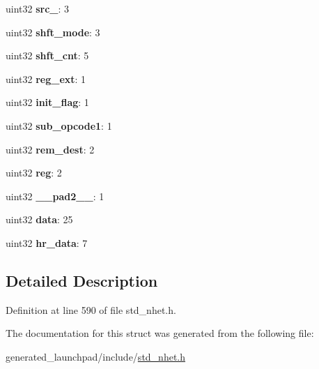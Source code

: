 \begin{DoxyCompactItemize}
\mbox{\label{structSBB__format_afdcd9cacebd184b370c239b838d129dd}} 
uint32 {\bfseries src\+\_}\+: 3
\item 
\mbox{\label{structSBB__format_aa3c8cd680cbfcde440830397c8beacab}} 
uint32 {\bfseries shft\+\_\+mode}\+: 3
\item 
\mbox{\label{structSBB__format_ac6175d582e2d2c2041771472c0dbb944}} 
uint32 {\bfseries shft\+\_\+cnt}\+: 5
\item 
\mbox{\label{structSBB__format_a006f1c587e70238260a8020941304f31}} 
uint32 {\bfseries reg\+\_\+ext}\+: 1
\item 
\mbox{\label{structSBB__format_aef1840f3384b8bd5e81c4ba5839edc6d}} 
uint32 {\bfseries init\+\_\+flag}\+: 1
\item 
\mbox{\label{structSBB__format_affba47127314f4a6f7abb06df9f8efca}} 
uint32 {\bfseries sub\+\_\+opcode1}\+: 1
\item 
\mbox{\label{structSBB__format_a6ccb39f6211d689d1cfcd5a52219295a}} 
uint32 {\bfseries rem\+\_\+dest}\+: 2
\item 
\mbox{\label{structSBB__format_a9f2044f8361ab45a3525ee8477324a94}} 
uint32 {\bfseries reg}\+: 2
\item 
\mbox{\label{structSBB__format_af49bfc098338ff67239de4e58e8d718e}} 
uint32 {\bfseries \+\_\+\+\_\+pad2\+\_\+\+\_\+}\+: 1
\item 
\mbox{\label{structSBB__format_ae8bf659e29dc177817b7870fbcd448af}} 
uint32 {\bfseries data}\+: 25
\item 
\mbox{\label{structSBB__format_ae79a18a83cac0a15df24b99ed8d8a8a0}} 
uint32 {\bfseries hr\+\_\+data}\+: 7
\end{DoxyCompactItemize}


\subsection{Detailed Description}


Definition at line 590 of file std\+\_\+nhet.\+h.



The documentation for this struct was generated from the following file\+:\begin{DoxyCompactItemize}
\item 
generated\+\_\+launchpad/include/\mbox{\hyperlink{std__nhet_8h}{std\+\_\+nhet.\+h}}\end{DoxyCompactItemize}
